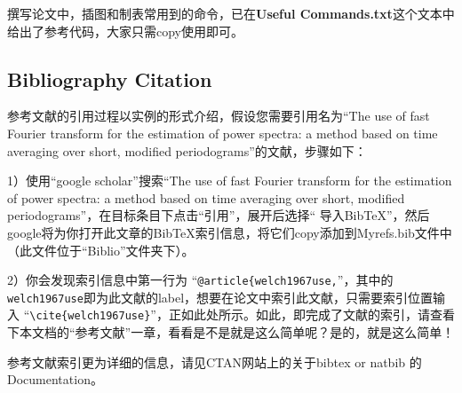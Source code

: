 撰写论文中，插图和制表常用到的命令，已在\textbf{Useful Commands.txt}这个文本中给出了参考代码，大家只需copy使用即可。

\subsection{Bibliography Citation}

参考文献的引用过程以实例的形式介绍，假设您需要引用名为“The use of fast Fourier transform for the estimation of power spectra: a method based on time averaging over short, modified periodograms”的文献，步骤如下：

1）使用“google scholar”搜索“The use of fast Fourier transform for the estimation of power spectra: a method based on time averaging over short, modified periodograms”，在目标条目下点击“引用”，展开后选择“ 导入BibTeX”，然后google将为你打开此文章的BibTeX索引信息，将它们copy添加到Myrefs.bib文件中（此文件位于“Biblio”文件夹下）。

2）你会发现索引信息中第一行为 “\verb|@article{welch1967use,|”，其中的 \verb|welch1967use|即为此文献的label，想要在论文中索引此文献，只需要索引位置输入 “\verb|\cite{welch1967use}|”，正如此处所示\cite{welch1967use}。如此，即完成了文献的索引，请查看下本文档的“参考文献”一章，看看是不是就是这么简单呢？是的，就是这么简单！

参考文献索引更为详细的信息，请见CTAN网站上的关于bibtex or natbib 的Documentation。
